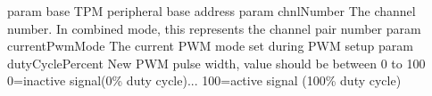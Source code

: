 param base T\+PM peripheral base address param chnl\+Number The channel number. In combined mode, this represents the channel pair number param current\+Pwm\+Mode The current P\+WM mode set during P\+WM setup param duty\+Cycle\+Percent New P\+WM pulse width, value should be between 0 to 100 0=inactive signal(0\% duty cycle)... 100=active signal (100\% duty cycle) 